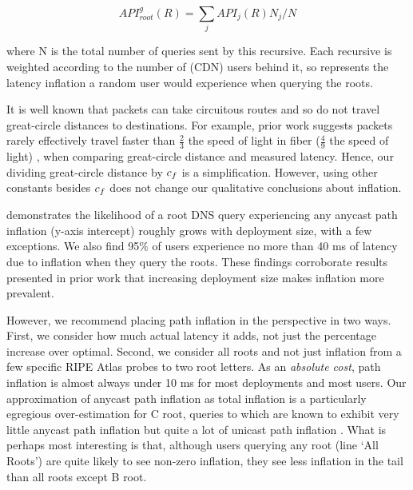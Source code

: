 \documentclass[sigconf,letterpaper,nonacm,10pt,anonymous]{acmart}
\begin{document}
\begin{equation}
API^g_{root}(R) = \sum_{j} API_{j}(R) N_j / N
\end{equation}

where N is the total number of queries sent by this recursive. Each
recursive is weighted according to the number of (CDN) users behind it,
so  represents the latency inflation a
random user would experience when querying the roots.

It is well known that packets can take circuitous routes and so do not
travel great-circle distances to destinations. For example, prior work
suggests packets rarely effectively travel faster than \(\frac{2}{3}\)
the speed of light in fiber (\(\frac{4}{9}\) the speed of light)
\cite{katz2006towards}, when comparing great-circle distance and
measured latency. Hence, our dividing great-circle distance by
\(\mathnormal{c_f}\) is a simplification. However, using other constants
besides \(\mathnormal{c_f}\) does not change our qualitative conclusions
about inflation.

 demonstrates the likelihood of a root DNS
query experiencing any anycast path inflation (y-axis intercept) roughly
grows with deployment size, with a few exceptions. We also find 95\% of
users experience no more than 40 ms of latency due to inflation when
they query the roots. These findings corroborate results presented in
prior work \cite{li_levin_spring_bhattacharjee_2018} that increasing
deployment size makes inflation more prevalent.

However, we recommend placing path inflation in the perspective in two
ways. First, we consider how much actual latency it adds, not just the
percentage increase over optimal. Second, we consider all roots and not
just inflation from a few specific RIPE Atlas probes to two root
letters. As an \emph{absolute cost}, path inflation is almost always
under 10 ms for most deployments and most users. Our approximation of
anycast path inflation as total inflation is a particularly egregious
over-estimation for C root, queries to which are known to exhibit very
little anycast path inflation but quite a lot of unicast path inflation
\cite{li_levin_spring_bhattacharjee_2018}. What is perhaps most
interesting is that, although users querying any root (line `All Roots')
are quite likely to see non-zero inflation, they see less inflation in
the tail than all roots except B root.
\end{document}
